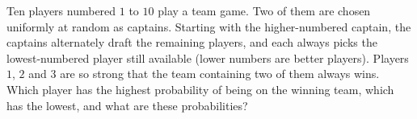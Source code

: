 Ten players numbered $1$ to $10$ play a team game. Two of them are chosen uniformly at random as captains. Starting with the higher-numbered captain, the captains alternately draft the remaining players, and each always picks the lowest-numbered player still available (lower numbers are better players). Players $1$, $2$ and $3$ are so strong that the team containing two of them always wins. Which player has the highest probability of being on the winning team, which has the lowest, and what are these probabilities?
